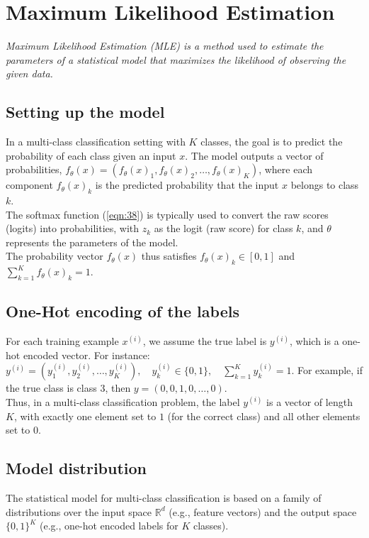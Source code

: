 \section{Maximum Likelihood Estimation}
\emph{Maximum Likelihood Estimation (MLE) is a method used to estimate the parameters of a statistical model that maximizes the likelihood of observing the given data.}

\subsection{Setting up the model}
In a multi-class classification setting with $K$ classes, the goal is to predict the probability of each class given an input $x$. The model outputs a vector of probabilities, $f_{\theta}(x) = (f_{\theta}(x)_1, f_{\theta}(x)_2, \ldots, f_{\theta}(x)_K)$, where each component $f_{\theta}(x)_k$ is the predicted probability that the input $x$ belongs to class $k$.\\

The softmax function (\ref{eqn:38}) is typically used to convert the raw scores (logits) into probabilities, with $z_k$ as the logit (raw score) for class $k$, and $\theta$ represents the parameters of the model.\\

The probability vector $f_{\theta}(x)$ thus satisfies $f_{\theta}(x)_k \in [0,1]$ and $\sum_{k=1}^{K} f_{\theta}(x)_k = 1$.

\subsection{One-Hot encoding of the labels}
For each training example $x^{(i)}$, we assume the true label is $y^{(i)}$, which is a one-hot encoded vector. For instance: $y^{(i)} = (y_1^{(i)}, y_2^{(i)}, \ldots, y_K^{(i)}), \quad y_k^{(i)} \in \{0,1\}, \quad \sum_{k=1}^{K} y_k^{(i)}=1$. For example, if the true class is class $3$, then $y = (0, 0, 1, 0, \ldots, 0)$.\\

Thus, in a multi-class classification problem, the label $y^{(i)}$ is a vector of length $K$, with exactly one element set to $1$ (for the correct class) and all other elements set to $0$.

\subsection{Model distribution}
The statistical model for multi-class classification is based on a family of distributions over the input space $\mathbb{R}^d$ (e.g., feature vectors) and the output space $\{0, 1\}^K$ (e.g., one-hot encoded labels for $K$ classes).

